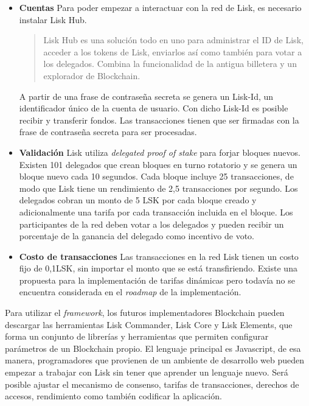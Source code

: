 \begin{itemize}

\item \textbf{Cuentas}\newline
Para poder empezar a interactuar con la red de Lisk, es necesario instalar Lisk Hub.
\begin{quote}
Lisk Hub es una solución todo en uno para administrar el ID de Lisk, acceder a los tokens de Lisk, enviarlos así como también para votar a los delegados. Combina la funcionalidad de la antigua billetera y un explorador de Blockchain.\cite{lisk_products}
\end{quote}
A partir de una frase de contraseña secreta se genera un Lisk-Id, un identificador único de la cuenta de usuario. Con dicho Lisk-Id es posible recibir y transferir fondos. Las transacciones tienen que ser firmadas con la frase de contraseña secreta para ser procesadas.

\item \textbf{Validación} \newline
Lisk utiliza \textit{delegated proof of stake} para forjar bloques nuevos.\cite{lisk_consensus} Existen 101 delegados que crean bloques en turno rotatorio y se genera un bloque nuevo cada 10 segundos. Cada bloque incluye 25 transacciones, de modo que Lisk tiene un rendimiento de 2,5 transacciones por segundo. Los delegados cobran un monto de 5 LSK por cada bloque creado y adicionalmente una tarifa por cada transacción incluida en el bloque. Los participantes de la red deben votar a los delegados y pueden recibir un porcentaje de la ganancia del delegado como incentivo de voto.

\item \textbf{Costo de transacciones} \newline
Las transacciones en la red Lisk tienen un costo fijo de 0,1LSK, sin importar el monto que se está transfiriendo.\cite{lisk_transactions} Existe una propuesta para la implementación de tarifas dinámicas pero todavía no se encuentra considerada en el \textit{roadmap} de la implementación. 

\end{itemize}

Para utilizar el \textit{framework}, los futuros implementadores Blockchain pueden descargar las herramientas Lisk Commander, Lisk Core y Lisk Elements, que forma un conjunto de librerías y herramientas que permiten configurar parámetros de un Blockchain propio. El lenguaje principal es Javascript, de esa manera, programadores que provienen de un ambiente de desarrollo web pueden empezar a trabajar con Lisk sin tener que aprender un lenguaje nuevo. Será posible ajustar el mecanismo de consenso, tarifas de transacciones, derechos de accesos, rendimiento como también codificar la aplicación.

